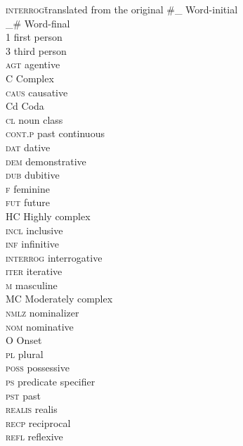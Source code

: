 \begin{multicols}{2}
\begin{tabbing}
\textsc{interrog}\hspace{1em}\= translated from the original\kill
\#\_            \> Word-initial\\
\_\#             \> Word-final\\
1                 \> first person\\
3                 \> third person\\
\textsc{agt}      \> agentive\\
C                 \> Complex\\
\textsc{caus}     \> causative\\
Cd                \> Coda\\
\textsc{cl}       \> noun class\\
\textsc{cont.p}   \> past continuous\\
\textsc{dat}      \> dative\\
\textsc{dem}      \> demonstrative\\
\textsc{dub}      \> dubitive\\
\textsc{f}        \> feminine\\
\textsc{fut}      \> future\\
HC                \> Highly complex\\
\textsc{incl}     \> inclusive\\
\textsc{inf}      \> infinitive\\
\textsc{interrog} \> interrogative\\
\textsc{iter}     \> iterative\\
\textsc{m}        \> masculine\\
MC                \> Moderately complex\\
\textsc{nmlz}     \> nominalizer\\
\textsc{nom}      \> nominative\\
O                 \> Onset\\
\textsc{pl}       \> plural\\
\textsc{poss}     \> possessive\\
\textsc{ps}       \> predicate specifier\\
\textsc{pst}      \> past\\
\textsc{realis}   \> realis\\
\textsc{recp}     \> reciprocal\\
\textsc{refl}     \> reflexive\\

\end{tabbing}
\end{multicols}
